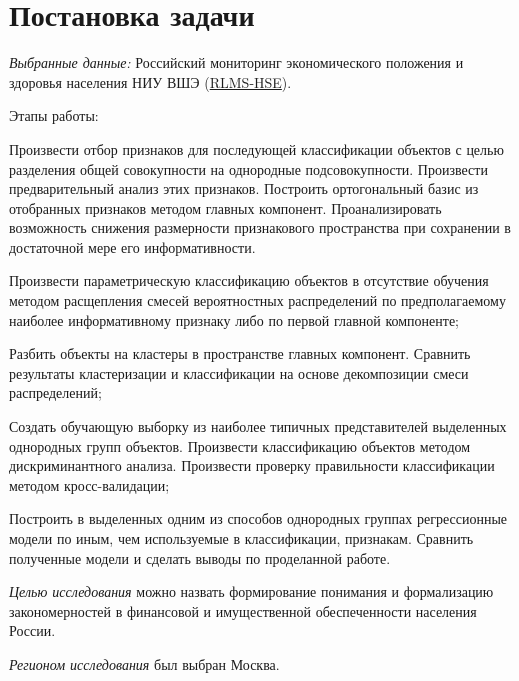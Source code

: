 \documentclass[12pt]{report}
\begin{document}

\boldmath
\tableofcontents
\newpage
\pagestyle{fancy}

\fancyhead[C]{\currentname}

\section{Постановка задачи}
\par 
\emph{Выбранные данные:} Российский мониторинг экономического положения и здоровья населения НИУ ВШЭ (\href{https://www.hse.ru/rlms/spss}{RLMS-HSE}).
\par
Этапы работы:
\begin{enumerate*}
    \item Произвести отбор признаков для последующей классификации объектов с целью разделения общей совокупности на однородные подсовокупности. Произвести предварительный анализ этих признаков. Построить ортогональный базис из отобранных признаков методом главных компонент. Проанализировать возможность снижения размерности признакового пространства при сохранении в достаточной мере его информативности.
    \item Произвести параметрическую классификацию объектов в отсутствие обучения методом расщепления смесей вероятностных распределений по предполагаемому наиболее информативному признаку либо по первой главной компоненте; 
    \item Разбить объекты на кластеры в пространстве главных компонент. Сравнить результаты кластеризации и классификации на основе декомпозиции смеси распределений;
    \item Создать обучающую выборку из наиболее типичных представителей выделенных однородных групп объектов. Произвести классификацию объектов методом дискриминантного анализа. Произвести проверку правильности классификации методом кросс-валидации;
    \item Построить в выделенных одним из способов однородных группах регрессионные модели по иным, чем используемые в классификации, признакам. Сравнить полученные модели и сделать выводы по проделанной работе.
\end{enumerate*}
\par
\emph{Целью исследования} можно назвать формирование понимания и формализацию закономерностей в финансовой и имущественной обеспеченности населения России.
\par 
\emph{Регионом исследования} был выбран Москва.
\newpage
\end{document}
